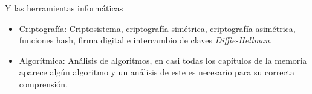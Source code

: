 Y las herramientas informáticas
\begin{itemize}
	\item Criptografía: Criptosistema, criptografía simétrica, criptografía asimétrica, funciones hash, firma digital e intercambio de claves \emph{Diffie-Hellman}. 
	\item Algorítmica: Análisis de algoritmos, en casi todas los capítulos de la memoria aparece algún algoritmo y un análisis de este es necesario para su correcta comprensión.
\end{itemize}

		
